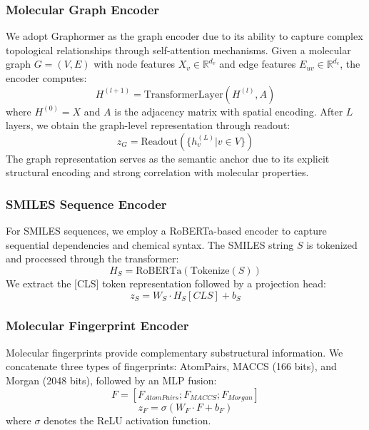 \documentclass[journal]{IEEEtran}
\begin{document}
\subsubsection{Molecular Graph Encoder}
We adopt Graphormer as the graph encoder due to its ability to capture complex topological relationships through self-attention mechanisms. Given a molecular graph $G = (V, E)$ with node features $X_v \in \mathbb{R}^{d_v}$ and edge features $E_{uv} \in \mathbb{R}^{d_e}$, the encoder computes:
\begin{equation}
H^{(l+1)} = \text{TransformerLayer}(H^{(l)}, A)
\end{equation}
where $H^{(0)} = X$ and $A$ is the adjacency matrix with spatial encoding. After $L$ layers, we obtain the graph-level representation through readout:
\begin{equation}
z_G = \text{Readout}(\{h_v^{(L)} | v \in V\})
\end{equation}
The graph representation serves as the semantic anchor due to its explicit structural encoding and strong correlation with molecular properties.

\subsubsection{SMILES Sequence Encoder}
For SMILES sequences, we employ a RoBERTa-based encoder to capture sequential dependencies and chemical syntax. The SMILES string $S$ is tokenized and processed through the transformer:
\begin{equation}
H_S = \text{RoBERTa}(\text{Tokenize}(S))
\end{equation}
We extract the [CLS] token representation followed by a projection head:
\begin{equation}
z_S = W_S \cdot H_S[CLS] + b_S
\end{equation}

\subsubsection{Molecular Fingerprint Encoder}
Molecular fingerprints provide complementary substructural information. We concatenate three types of fingerprints: AtomPairs, MACCS (166 bits), and Morgan (2048 bits), followed by an MLP fusion:
\begin{equation}
F = [F_{AtomPairs}; F_{MACCS}; F_{Morgan}]
\end{equation}
\begin{equation}
z_F = \sigma(W_F \cdot F + b_F)
\end{equation}
where $\sigma$ denotes the ReLU activation function.
\end{document}

